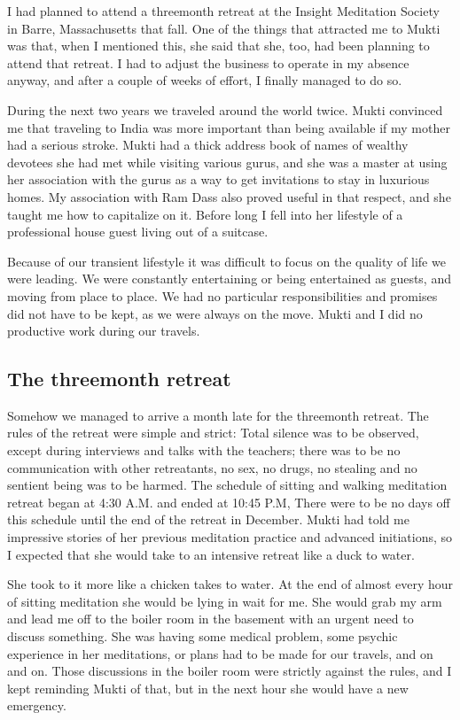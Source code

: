\documentclass[a5paper,10pt,english]{book}
\begin{document}
\sphinxAtStartPar
I had planned to attend a three\sphinxhyphen{}month retreat at the Insight Meditation
Society in Barre, Massachusetts that fall. One of the things that
attracted me to Mukti was that, when I mentioned this, she said that
she, too, had been planning to attend that retreat. I had to adjust the
business to operate in my absence anyway, and after a couple of weeks of
effort, I finally managed to do so.

\sphinxAtStartPar
During the next two years we traveled around the world twice. Mukti
convinced me that traveling to India was more important than being
available if my mother had a serious stroke. Mukti had a thick address
book of names of wealthy devotees she had met while visiting various
gurus, and she was a master at using her association with the gurus as a
way to get invitations to stay in luxurious homes. My association with
Ram Dass also proved useful in that respect, and she taught me how to
capitalize on it. Before long I fell into her lifestyle of a
professional house guest living out of a suitcase.

\sphinxAtStartPar
Because of our transient lifestyle it was difficult to focus on the
quality of life we were leading. We were constantly entertaining or
being entertained as guests, and moving from place to place. We had no
particular responsibilities and promises did not have to be kept, as we
were always on the move. Mukti and I did no productive work during our
travels.


\subsection{The three\sphinxhyphen{}month retreat}
\label{\detokenize{psychopaths:the-three-month-retreat}}
\sphinxAtStartPar
Somehow we managed to arrive a month late for the three\sphinxhyphen{}month retreat.
The rules of the retreat were simple and strict: Total silence was to be
observed, except during interviews and talks with the teachers; there
was to be no communication with other retreatants, no sex, no drugs, no
stealing and no sentient being was to be harmed. The schedule of sitting
and walking meditation retreat began at 4:30 A.M. and ended at 10:45
P.M, There were to be no days off this schedule until the end of the
retreat in December. Mukti had told me impressive stories of her
previous meditation practice and advanced initiations, so I expected
that she would take to an intensive retreat like a duck to water.

\sphinxAtStartPar
She took to it more like a chicken takes to water. At the end of almost
every hour of sitting meditation she would be lying in wait for me. She
would grab my arm and lead me off to the boiler room in the basement
with an urgent need to discuss something. She was having some medical
problem, some psychic experience in her meditations, or plans had to be
made for our travels, and on and on. Those discussions in the boiler
room were strictly against the rules, and I kept reminding Mukti of
that, but in the next hour she would have a new emergency.
\end{document}
